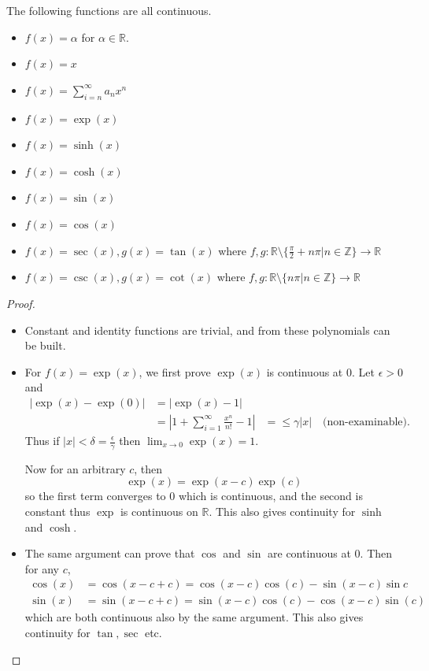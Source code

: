 \begin{prop}
  The following functions are all continuous.

  \begin{itemize}
    \item $f(x) = \alpha$ for $\alpha \in \mathbb{R}$.
    \item $f(x) = x$
    \item $f(x) = \sum_{ i = n}^{\infty} a_n x^n$
    \item $f(x) = \exp(x)$
    \item $f(x) = \sinh(x)$
    \item $f(x) = \cosh(x)$
    \item $f(x) = \sin(x)$
    \item $f(x) = \cos(x)$
    \item $f(x) = \sec(x), g(x) = \tan(x)$ where $f, g : \mathbb{R} \setminus \{ \frac{\pi}{2} + n \pi | n \in \mathbb{Z}\} \rightarrow \mathbb{R}$
    \item $f(x) = \csc(x), g(x) = \cot(x)$ where $f, g : \mathbb{R} \setminus \{ n \pi | n \in \mathbb{Z}\} \rightarrow \mathbb{R}$

  \end{itemize}

\end{prop}
\begin{proof} $ $
  \begin{itemize}
    \item Constant and identity functions are trivial, and from these polynomials can be built.
    \item For $f(x) = \exp(x)$, we first prove $\exp(x)$ is continuous at $0$. Let $\epsilon > 0$ and
      \begin{align*}
        |\exp(x) - \exp(0)| &= |\exp(x) - 1| \\
        &= |1 + \sum_{ i = 1}^{\infty} \frac{x^n}{n!} - 1|
        &= \leq \gamma |x| \quad \text{(non-examinable)}
      .\end{align*}
      Thus if $|x| < \delta = \frac{\epsilon}{\gamma}$ then $\lim_{x \rightarrow 0} \exp(x) = 1$.

      \noindent Now for an arbitrary $c$, then
      \[\exp(x) = \exp(x - c) \exp(c)\]
      so the first term converges to $0$ which is continuous, and the second is constant thus $\exp$ is continuous on $\mathbb{R}$. This also gives continuity for $\sinh$ and $\cosh$.
    \item The same argument can prove that $\cos$ and $\sin$ are continuous at $0$. Then for any $c$,
      \begin{align*}
        \cos(x) &= \cos(x - c + c) = \cos(x - c)\cos(c) - \sin(x -c) \sin c \\
        \sin(x) &= \sin(x - c + c) = \sin(x - c) \cos (c) - \cos (x - c) \sin(c)
      \end{align*}
      which are both continuous also by the same argument. This also gives continuity for $\tan, \sec$ etc.
  \end{itemize}
\end{proof}

